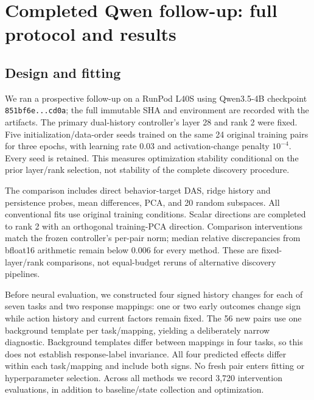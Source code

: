 \documentclass{article}
\begin{document}
\section{Completed Qwen follow-up: full protocol and results}\label{app:followup}
\subsection{Design and fitting}
We ran a prospective follow-up on a RunPod L40S using Qwen3.5-4B checkpoint \texttt{851bf6e...cd0a}; the full immutable SHA and environment are recorded with the artifacts. The primary dual-history controller's layer 28 and rank 2 were fixed. Five initialization/data-order seeds trained on the same 24 original training pairs for three epochs, with learning rate 0.03 and activation-change penalty $10^{-4}$. Every seed is retained. This measures optimization stability conditional on the prior layer/rank selection, not stability of the complete discovery procedure.

The comparison includes direct behavior-target DAS, ridge history and persistence probes, mean differences, PCA, and 20 random subspaces. All conventional fits use original training conditions. Scalar directions are completed to rank 2 with an orthogonal training-PCA direction. Comparison interventions match the frozen controller's per-pair norm; median relative discrepancies from bfloat16 arithmetic remain below 0.006 for every method. These are fixed-layer/rank comparisons, not equal-budget reruns of alternative discovery pipelines.

Before neural evaluation, we constructed four signed history changes for each of seven tasks and two response mappings: one or two early outcomes change sign while action history and current factors remain fixed. The 56 new pairs use one background template per task/mapping, yielding a deliberately narrow diagnostic. Background templates differ between mappings in four tasks, so this does not establish response-label invariance. All four predicted effects differ within each task/mapping and include both signs. No fresh pair enters fitting or hyperparameter selection. Across all methods we record 3,720 intervention evaluations, in addition to baseline/state collection and optimization.
\end{document}
